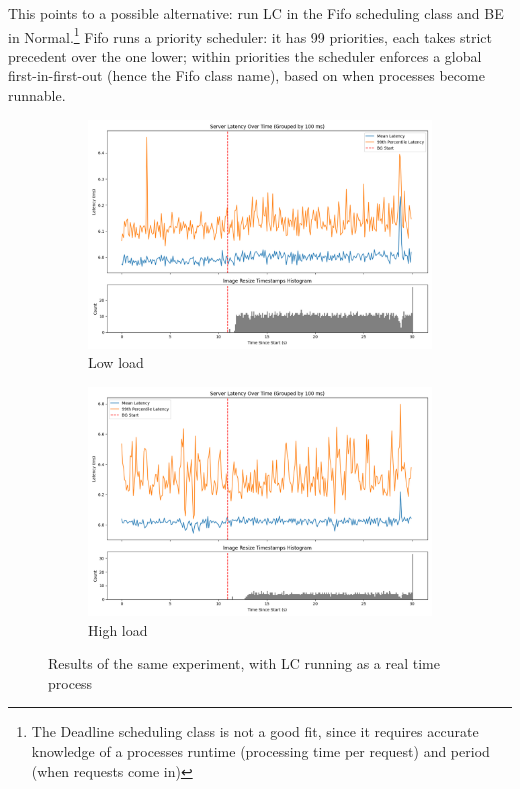 This points to a possible alternative: run LC in the Fifo scheduling class and BE
in Normal.\footnote{The Deadline scheduling class is not a good fit, since it
requires accurate knowledge of a processes runtime (processing time per request)
and period (when requests come in)} Fifo runs a priority scheduler: it has 99
priorities, each takes strict precedent over the one lower; within priorities
the scheduler enforces a global first-in-first-out (hence the Fifo class name),
based on when processes become runnable.

\begin{figure}[t]
    \centering
    \begin{subfigure}[t]{0.48\columnwidth}
        \includegraphics[width=\columnwidth]{graphs/unedited-rt-low-two.png}
        \caption{Low load}\label{fig:unedited-rt-low-two}
    \end{subfigure}
    \hspace{\fill}
    \begin{subfigure}[t]{0.48\columnwidth}
        \includegraphics[width=\columnwidth]{graphs/unedited-rt-high-two.png}
        \caption{High load}\label{fig:unedited-rt-high-two}
    \end{subfigure}
    \vspace{4pt}
    \caption{Results of the same experiment, with LC running as a real time process}\label{fig:unedited-rt}
\end{figure}

